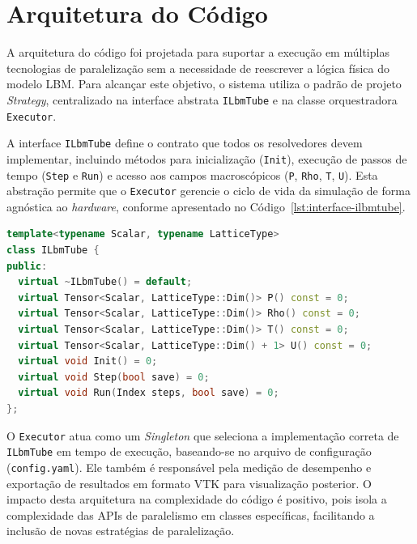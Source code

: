 
\section{Arquitetura do Código}\label{sec:arquitetura-simulador}

A arquitetura do código foi projetada para suportar a execução em múltiplas tecnologias de paralelização sem a necessidade de reescrever a lógica física do modelo LBM. Para alcançar este objetivo, o sistema utiliza o padrão de projeto \textit{Strategy}, centralizado na interface abstrata \texttt{ILbmTube} e na classe orquestradora \texttt{Executor}.

A interface \texttt{ILbmTube} define o contrato que todos os resolvedores devem implementar, incluindo métodos para inicialização (\texttt{Init}), execução de passos de tempo (\texttt{Step} e \texttt{Run}) e acesso aos campos macroscópicos (\texttt{P}, \texttt{Rho}, \texttt{T}, \texttt{U}). Esta abstração permite que o \texttt{Executor} gerencie o ciclo de vida da simulação de forma agnóstica ao \textit{hardware}, conforme apresentado no Código~\ref{lst:interface-ilbmtube}.
\begin{lstlisting}[language=C++, caption={Interface base ILbmTube que define o contrato para os resolvedores.}, label={lst:interface-ilbmtube}, float=ht]
template<typename Scalar, typename LatticeType>
class ILbmTube {
public:
  virtual ~ILbmTube() = default;
  virtual Tensor<Scalar, LatticeType::Dim()> P() const = 0;
  virtual Tensor<Scalar, LatticeType::Dim()> Rho() const = 0;
  virtual Tensor<Scalar, LatticeType::Dim()> T() const = 0;
  virtual Tensor<Scalar, LatticeType::Dim() + 1> U() const = 0;
  virtual void Init() = 0;
  virtual void Step(bool save) = 0;
  virtual void Run(Index steps, bool save) = 0;
};
\end{lstlisting}

O \texttt{Executor} atua como um \textit{Singleton} que seleciona a implementação correta de \texttt{ILbmTube} em tempo de execução, baseando-se no arquivo de configuração (\texttt{config.yaml}). Ele também é responsável pela medição de desempenho e exportação de resultados em formato VTK para visualização posterior.
O impacto desta arquitetura na complexidade do código é positivo, pois isola a complexidade das APIs de paralelismo em classes específicas, facilitando a inclusão de novas estratégias de paralelização.

